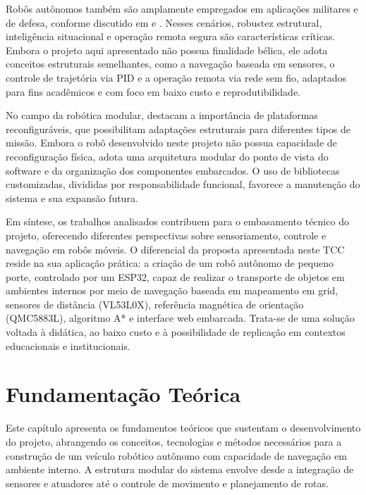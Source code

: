 \documentclass[	12pt, Times, openright, twoside, a4paper, english, brazil]{abntex2}
\begin{document}
Robôs autônomos também são amplamente empregados em aplicações militares e de defesa, conforme discutido em  e . Nesses cenários, robustez estrutural, inteligência situacional e operação remota segura são características críticas. Embora o projeto aqui apresentado não possua finalidade bélica, ele adota conceitos estruturais semelhantes, como a navegação baseada em sensores, o controle de trajetória via PID e a operação remota via rede sem fio, adaptados para fins acadêmicos e com foco em baixo custo e reprodutibilidade.

No campo da robótica modular,  destacam a importância de plataformas reconfiguráveis, que possibilitam adaptações estruturais para diferentes tipos de missão. Embora o robô desenvolvido neste projeto não possua capacidade de reconfiguração física, adota uma arquitetura modular do ponto de vista do software e da organização dos componentes embarcados. O uso de bibliotecas customizadas, divididas por responsabilidade funcional, favorece a manutenção do sistema e sua expansão futura.

Em síntese, os trabalhos analisados contribuem para o embasamento técnico do projeto, oferecendo diferentes perspectivas sobre sensoriamento, controle e navegação em robôs móveis. O diferencial da proposta apresentada neste TCC reside na sua aplicação prática: a criação de um robô autônomo de pequeno porte, controlado por um ESP32, capaz de realizar o transporte de objetos em ambientes internos por meio de navegação baseada em mapeamento em grid, sensores de distância (VL53L0X), referência magnética de orientação (QMC5883L), algoritmo A* e interface web embarcada. Trata-se de uma solução voltada à didática, ao baixo custo e à possibilidade de replicação em contextos educacionais e institucionais.


\chapter{Fundamentação Teórica}
\label{cap:fundamentacao_teorica}

Este capítulo apresenta os fundamentos teóricos que sustentam o desenvolvimento do projeto, abrangendo os conceitos, tecnologias e métodos necessários para a construção de um veículo robótico autônomo com capacidade de navegação em ambiente interno. A estrutura modular do sistema envolve desde a integração de sensores e atuadores até o controle de movimento e planejamento de rotas.
\end{document}
